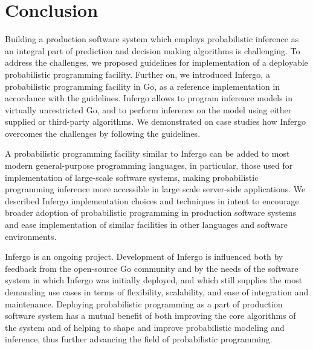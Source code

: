 \documentclass[sigplan,review,10pt,anonymous]{acmart}
\begin{document}
\begin{sloppypar}
\section{Conclusion}

Building a production software system which employs
probabilistic inference as an integral part of prediction and
decision making algorithms is challenging. To address the
challenges, we proposed guidelines for implementation of a
deployable probabilistic programming facility. Further on, we
introduced Infergo, a probabilistic programming facility in Go,
as a reference implementation in accordance with the guidelines.
Infergo allows to program inference models in virtually
unrestricted Go, and to perform inference on the model using
either supplied or third-party algorithms. We demonstrated on
case studies how Infergo overcomes the challenges by following
the guidelines.

A probabilistic programming facility similar to Infergo can be
added to most modern general-purpose programming languages, in
particular, those used for implementation of large-scale software
systems, making probabilistic programming inference more
accessible in large scale server-side applications. We described
Infergo implementation choices and techniques in intent
to encourage broader adoption of probabilistic programming in
production software systems and ease implementation of similar
facilities in other languages and software environments.

Infergo is an ongoing project. Development of Infergo is
influenced both by feedback from the open-source Go community
and by the needs of the software system in which Infergo was
initially deployed, and which still supplies the most demanding
use cases in terms of flexibility, scalability, and ease of
integration and maintenance. Deploying probabilistic programming
as a part of production software system has a mutual benefit of
both improving the core algorithms of the system and of helping
to shape and improve probabilistic modeling and inference, thus
further advancing the field of probabilistic programming.

\end{sloppypar}



\end{document}
